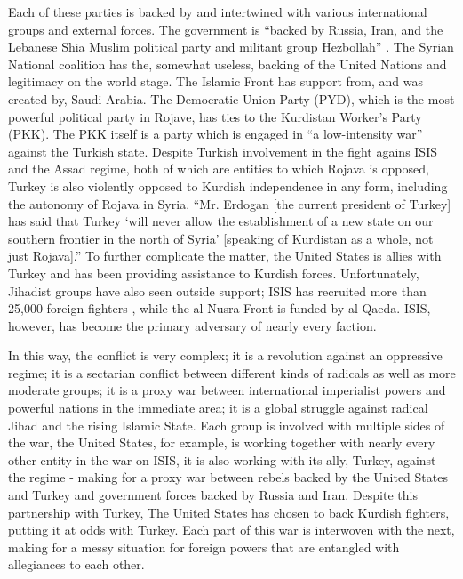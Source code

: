 \documentclass[a4paper,titlepage,12pt]{turabian-researchpaper}
\begin{document}
Each of these parties is backed by and intertwined with various international groups
and external forces. The government is ``backed by Russia, Iran, and the
Lebanese Shia Muslim political party and militant group Hezbollah'' \autocite{cfr}. The
Syrian National coalition has the, somewhat useless, backing of the United
Nations and legitimacy on the world stage. \autocite{legit} The Islamic Front
has support from, and was created by, Saudi Arabia. \autocite[15]{sectarian}
The Democratic Union Party (PYD), which is the most powerful political party in
Rojave, has ties to the Kurdistan Worker's Party (PKK). The PKK itself is a party
which is engaged in ``a low-intensity war'' against the Turkish state. \autocite[1-2]{defense} Despite
Turkish involvement in the fight agains ISIS and the Assad regime, both of
which are entities to which Rojava is opposed, Turkey is also violently opposed
to Kurdish independence in any form, including the autonomy of Rojava in Syria.
``Mr. Erdogan [the current president of Turkey] has said that Turkey `will
never allow the establishment of a new state on our southern frontier in the
north of Syria' [speaking of Kurdistan as a whole, not just Rojava].'' To
further complicate the matter, the United States is allies with Turkey and has been
providing assistance to Kurdish forces. \autocite{turkey} Unfortunately, Jihadist groups have
also seen outside support; ISIS has recruited more than 25,000 foreign
fighters \autocite{cfr}, while the al-Nusra Front is funded by al-Qaeda. ISIS, however, has
become the primary adversary of nearly every faction. \autocite{untangle}

In this way, the conflict is very complex; it is a revolution against an
oppressive regime; it is a sectarian conflict between different kinds of
radicals as well as more moderate groups; it is a proxy war between
international imperialist powers and powerful nations in the immediate area;
it is a global struggle against radical Jihad and the rising Islamic State.
Each group is involved with multiple sides of the war, the United States, for
example, is working together with nearly every other entity in the war on ISIS,
it is also working with its ally, Turkey, against the regime - making for a
proxy war between rebels backed by the United States and Turkey and government
forces backed by Russia and Iran. Despite this partnership with Turkey, The
United States has chosen to back Kurdish fighters, putting it at odds with
Turkey. Each part of this war is interwoven with the next, making for a messy
situation for foreign powers that are entangled with allegiances to each other.
\autocite{untangle} \autocite{cfr}
\end{document}

